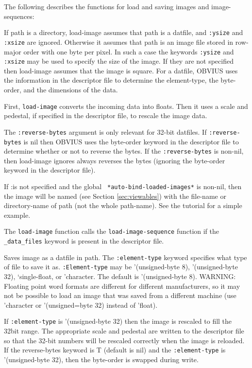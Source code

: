 The following describes the functions for load and saving images and
image-sequences:
\begin{description}
\item{}
If path is a directory, load-image assumes that path is a datfile, and
{\tt :ysize} and {\tt :xsize} are ignored.  Otherwise it assumes that
path is an image file stored in row-major order with one byte per
pixel.  In such a case the keywords {\tt :ysize} and {\tt :xsize} may
be used to specify the size of the image.  If they are not specified
then load-image assumes that the image is square.  For a datfile,
OBVIUS uses the information in the descriptor file to determine the
element-type, the byte-order, and the dimensions of the data.

First, {\tt load-image} converts the incoming data into floats.  Then
it uses a scale and pedestal, if specified in the descriptor file, to
rescale the image data.

The {\tt :reverse-bytes} argument is only relevant for 32-bit
datfiles.  If {\tt :reverse-bytes} is nil then OBVIUS uses the
byte-order keyword in the descriptor file to determine whether or not
to reverse the bytes.  If the {\tt :reverse-bytes} is non-nil, then
load-image ignores always reverses the bytes (ignoring the byte-order
keyword in the descriptor file).

If :\res is not specified and the global {\tt
*auto-bind-loaded-images*} is non-nil, then the image will be named
(see Section \ref{sec:viewables}) with the file-name or directory-name
of path (not the whole path-name).  See the tutorial for a simple
example.

The {\tt load-image} function calls the {\tt load-image-sequence}
function if the {\tt \_data\_files} keyword is present in the
descriptor file.

\item{}
Saves image as a datfile in path.  The {\tt :element-type} keyword specifies
what type of file to save it as.  {\tt :Element-type} may be '(unsigned-byte
8), '(unsigned-byte 32), `single-float, or 'character.  The default is
'(unsigned-byte 8).  WARNING: Floating point word formats are
different for different manufacturers, so it may not be possible to
load an image that was saved from a different machine (use 'character
or '(unsigned=byte 32) instead of 'float). 

If {\tt :element-type} is '(unsigned-byte 32) then the image is
rescaled to fill the 32bit range.  The appropriate scale and pedestal
are written to the descriptor file so that the 32-bit numbers will be
rescaled correctly when the image is reloaded.  If the reverse-bytes
keyword is T (default is nil) and the {\tt :element-type} is
'(unsigned-byte 32), then the byte-order is swapped during write.


\end{description}
